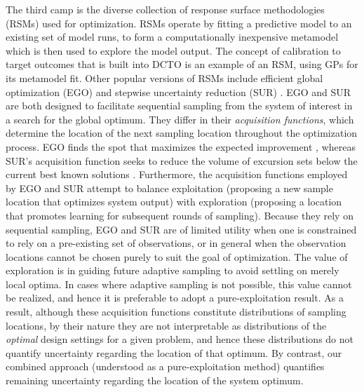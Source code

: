 \documentclass[10pt]{asme2ej}
\begin{document}
%
The third camp is the diverse collection of response surface methodologies (RSMs) \cite{Dean2017} used for optimization.
%
RSMs operate by fitting a predictive model to an existing set of model runs, to form a computationally inexpensive metamodel which is then used to explore the model output.
%
The concept of calibration to target outcomes that is built into DCTO is an example of an RSM, using GPs for its metamodel fit.
%
Other popular versions of RSMs include efficient global optimization (EGO) \cite{Jones1998,Brochu2010} and stepwise uncertainty reduction (SUR) \cite{Geman1996,Villemonteix2009,Chevalier2014,Picheny2015,MiguelHernandez-Lobato2016,Picheny2019,Binois2019}.
%
EGO and SUR are both designed to facilitate sequential sampling from the system of interest in a search for the global optimum.
%
They differ in their \textit{acquisition functions}, which determine the location of the next sampling location throughout the optimization process.
%
EGO finds the spot that maximizes the expected improvement \cite{Mockus1978,Jones1998}, whereas SUR's acquisition function seeks to reduce the volume of excursion sets below the current best known solutions \cite{Chevalier2014}.
%
Furthermore, the acquisition functions employed by EGO and SUR attempt to balance exploitation (proposing a new sample location that optimizes system output) with exploration (proposing a location that promotes learning for subsequent rounds of sampling).
%
Because they rely on sequential sampling, EGO and SUR are of limited utility when one is constrained to rely on a pre-existing set of observations, or in general when the observation locations cannot be chosen purely to suit the goal of optimization.
%
The value of exploration is in guiding future adaptive sampling to avoid settling on merely local optima.
%
In cases where adaptive sampling is not possible, this value cannot be realized, and hence it is preferable to adopt a pure-exploitation result.
%
As a result, although these acquisition functions constitute distributions of sampling locations, by their nature they are not interpretable as distributions of the \textit{optimal} design settings for a given problem, and hence these distributions do not quantify uncertainty regarding the location of that optimum.
%
By contrast, our combined approach (understood as a pure-exploitation method) quantifies remaining uncertainty regarding the location of the system optimum.
%
\end{document}
